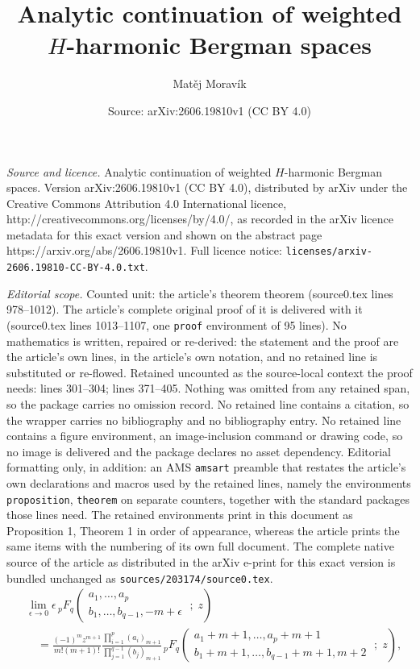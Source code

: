 \documentclass[10pt,a4paper]{amsart}
\title{Analytic continuation of weighted $H$-harmonic Bergman spaces}
\author{Mat\v{e}j Morav\'ik}
\date{Source: arXiv:2606.19810v1 (CC BY 4.0)}
\begin{document}
\maketitle

\noindent\emph{Source and licence.} Analytic continuation of weighted $H$-harmonic Bergman spaces. Version arXiv:2606.19810v1 (CC BY 4.0), distributed by arXiv under the Creative Commons Attribution 4.0 International licence, http://creativecommons.org/licenses/by/4.0/, as recorded in the arXiv licence metadata for this exact version and shown on the abstract page https://arxiv.org/abs/2606.19810v1. Full licence notice: \texttt{licenses/arxiv-2606.19810-CC-BY-4.0.txt}.\par\smallskip

\noindent\textit{Editorial scope.} Counted unit: the article's theorem theorem (source0.tex lines 978--1012). The article's complete original proof of it is delivered with it (source0.tex lines 1013--1107, one \texttt{proof} environment of 95 lines). No mathematics is written, repaired or re-derived: the statement and the proof are the article's own lines, in the article's own notation, and no retained line is substituted or re-flowed.  Retained uncounted as the source-local context the proof needs: lines 301--304; lines 371--405.  Nothing was omitted from any retained span, so the package carries no omission record.  No retained line contains a citation, so the wrapper carries no bibliography and no bibliography entry.  No retained line contains a figure environment, an image-inclusion command or drawing code, so no image is delivered and the package declares no asset dependency.  Editorial formatting only, in addition: an AMS \texttt{amsart} preamble that restates the article's own declarations and macros used by the retained lines, namely the environments \texttt{proposition}, \texttt{theorem} on separate counters, together with the standard packages those lines need.  The retained environments print in this document as Proposition 1, Theorem 1 in order of appearance, whereas the article prints the same items with the numbering of its own full document.  The complete native source of the article as distributed in the arXiv e-print for this exact version is bundled unchanged as \texttt{sources/203174/source0.tex}.
\begin{align}\label{TheIdentity}
   &\lim_{\epsilon \to 0} \epsilon \, {}_p F_q\left( \begin{matrix} a_1, \dots, a_p \\[3pt] b_1, \dots, b_{q-1}, -m+\epsilon \end{matrix} \;;\; z \right) \nonumber \\
   &\quad = \frac{(-1)^m z^{m+1}}{m! (m+1)!} \frac{\prod_{i=1}^p (a_i)_{m+1}}{\prod_{j=1}^{q-1} (b_j)_{m+1}} \, {}_p F_q\left( \begin{matrix} a_1+m+1, \dots, a_p+m+1 \\ b_1+m+1, \dots, b_{q-1}+m+1, m+2 \end{matrix} \;;\; z \right),
\end{align}
\end{document}
